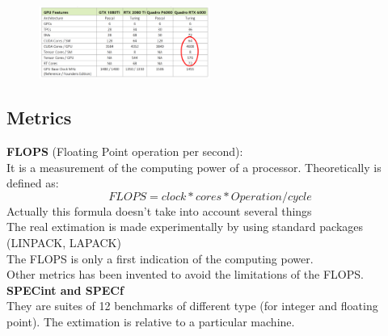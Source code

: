 \begin{figure}[ht]
	\centering
	\includegraphics[width=0.5\textwidth]{figure_parallel/cores2.png}\end{figure}
\FloatBarrier


\subsection{Metrics}

\textbf{FLOPS} (Floating Point operation per
second):\\
It is a measurement of the computing power of a processor. Theoretically is defined as:
\begin{equation*}
	FLOPS = clock * cores * Operation/cycle
\end{equation*}
Actually this formula doesn’t take into account several things\\
The real extimation is made experimentally by using standard packages (LINPACK,
LAPACK)\\
The FLOPS is only a first indication of the computing power.\\
Other metrics has been invented to avoid the limitations of the FLOPS.\\

\textbf{SPECint and SPECf}\\
They are suites of 12 benchmarks of different type (for integer and floating point). The extimation is relative to a particular
machine.



